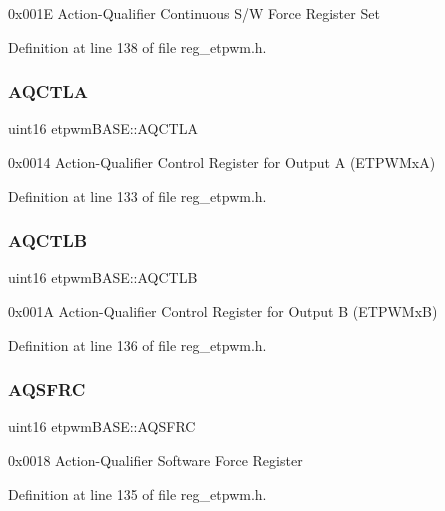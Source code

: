 0x001E Action-\/\+Qualifier Continuous S/W Force Register Set 

Definition at line 138 of file reg\+\_\+etpwm.\+h.

\mbox{\label{structetpwmBASE_af1296fe251cb0eee1888b4e57b0f3b86}} 
\subsubsection{\texorpdfstring{A\+Q\+C\+T\+LA}{AQCTLA}}
{\footnotesize\ttfamily uint16 etpwm\+B\+A\+S\+E\+::\+A\+Q\+C\+T\+LA}

0x0014 Action-\/\+Qualifier Control Register for Output A (E\+T\+P\+W\+MxA) 

Definition at line 133 of file reg\+\_\+etpwm.\+h.

\mbox{\label{structetpwmBASE_a2dcde289ae129bb6e6ae8e90f0037f83}} 
\subsubsection{\texorpdfstring{A\+Q\+C\+T\+LB}{AQCTLB}}
{\footnotesize\ttfamily uint16 etpwm\+B\+A\+S\+E\+::\+A\+Q\+C\+T\+LB}

0x001A Action-\/\+Qualifier Control Register for Output B (E\+T\+P\+W\+MxB) 

Definition at line 136 of file reg\+\_\+etpwm.\+h.

\mbox{\label{structetpwmBASE_aca7ec69e92033e9e8e192859ecc8fbfc}} 
\subsubsection{\texorpdfstring{A\+Q\+S\+F\+RC}{AQSFRC}}
{\footnotesize\ttfamily uint16 etpwm\+B\+A\+S\+E\+::\+A\+Q\+S\+F\+RC}

0x0018 Action-\/\+Qualifier Software Force Register 

Definition at line 135 of file reg\+\_\+etpwm.\+h.

